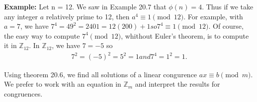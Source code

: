 \documentclass[11pt]{article}
\begin{document}
\textbf{Example: } Let n = 12. We saw in Example 20.7 that $\phi(n) = 4$. Thus if we take any integer $a$ relatively prime to 12, then $a^4 \equiv 1 \pmod{12}$. For example, with $a = 7$, we have $7^4 = 49^2 = 2401 = 12(200) + 1 so 7^4 \equiv 1\pmod{12}$. 
Of course, the easy way to compute $7^4 \pmod{12}$, whithout Euler's theorem, is to compute it in $\mathbb{Z}_{12}$. In $\mathbb{Z}_{12}$, we have $7=-5$ so 
\begin{align*}
    7^2 = (-5)^2 = 5^2 = 1 and 7^4 = 1^2 = 1.
\end{align*}

Using theorem 20.6, we find all solutions of a linear congurence $ax \equiv b \pmod{m}$. We prefer to work with an equation in $\mathbb{Z}_m$ and interpret the results for congruences.
\end{document}
